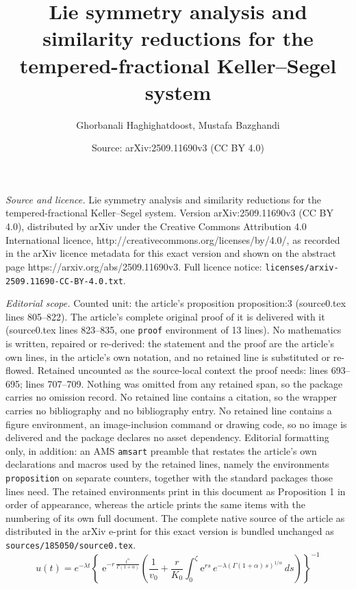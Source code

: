\documentclass[10pt,a4paper]{amsart}
\title{Lie symmetry analysis and similarity reductions for the tempered-fractional Keller--Segel system}
\author{Ghorbanali Haghighatdoost, Mustafa Bazghandi}
\date{Source: arXiv:2509.11690v3 (CC BY 4.0)}
\begin{document}
\maketitle

\noindent\emph{Source and licence.} Lie symmetry analysis and similarity reductions for the tempered-fractional Keller--Segel system. Version arXiv:2509.11690v3 (CC BY 4.0), distributed by arXiv under the Creative Commons Attribution 4.0 International licence, http://creativecommons.org/licenses/by/4.0/, as recorded in the arXiv licence metadata for this exact version and shown on the abstract page https://arxiv.org/abs/2509.11690v3. Full licence notice: \texttt{licenses/arxiv-2509.11690-CC-BY-4.0.txt}.\par\smallskip

\noindent\textit{Editorial scope.} Counted unit: the article's proposition proposition:3 (source0.tex lines 805--822). The article's complete original proof of it is delivered with it (source0.tex lines 823--835, one \texttt{proof} environment of 13 lines). No mathematics is written, repaired or re-derived: the statement and the proof are the article's own lines, in the article's own notation, and no retained line is substituted or re-flowed.  Retained uncounted as the source-local context the proof needs: lines 693--695; lines 707--709.  Nothing was omitted from any retained span, so the package carries no omission record.  No retained line contains a citation, so the wrapper carries no bibliography and no bibliography entry.  No retained line contains a figure environment, an image-inclusion command or drawing code, so no image is delivered and the package declares no asset dependency.  Editorial formatting only, in addition: an AMS \texttt{amsart} preamble that restates the article's own declarations and macros used by the retained lines, namely the environments \texttt{proposition} on separate counters, together with the standard packages those lines need.  The retained environments print in this document as Proposition 1 in order of appearance, whereas the article prints the same items with the numbering of its own full document.  The complete native source of the article as distributed in the arXiv e-print for this exact version is bundled unchanged as \texttt{sources/185050/source0.tex}.
\begin{equation}\label{eq:6_AIU2}
u(t)=e^{-\lambda t}\left\{\; \mathrm{e}^{-r\,\frac{t^\alpha}{\Gamma(1+\alpha)}}\!\left(\frac{1}{v_0}+\frac{r}{K_0}\int_{0}^{\zeta}\mathrm{e}^{r s}\,e^{-\lambda(\Gamma(1+\alpha)\,s)^{1/\alpha}}\,ds\right)\right\}^{-1}
\end{equation}
\end{document}
